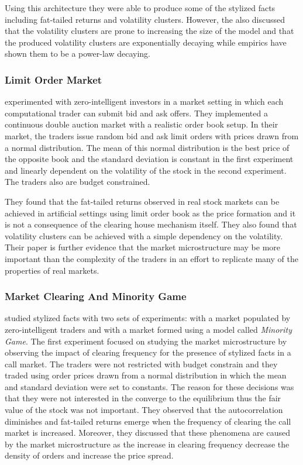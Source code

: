 Using this architecture they were able to produce some of the stylized facts
including fat-tailed returns and volatility clusters. However, the also discussed
that the volatility clusters are prone to increasing the size of the model and
that the produced volatility clusters are exponentially decaying while empirics have
shown them to be a power-law decaying.

\subsubsection{Limit Order Market}
\citet{Raberto05} experimented with zero-intelligent investors in a market setting
in which each computational trader can submit bid and ask offers. They
implemented a continuous double auction market with a realistic order
book setup. In their market, the traders issue random bid and ask limit
orders with prices drawn from a normal distribution. The mean of this 
normal distribution is the best price of the opposite book and the 
standard deviation is constant in the first experiment and linearly 
dependent on the volatility of the stock in the second experiment. The
traders also are budget constrained. 

They found that the fat-tailed returns observed in
real stock markets can be achieved in artificial settings using limit 
order book as the price formation and it is not a consequence of the clearing 
house mechanism itself. They also found that volatility clusters can
be achieved with a simple dependency on the volatility. Their paper
is further evidence that the market microstructure may be more
important than the complexity of the traders in an effort to replicate
many of the properties of real markets.

\subsubsection{Market Clearing And Minority Game}

\citet{LIU20082535} studied stylized facts with two sets of experiments: with
a market populated by zero-intelligent traders and with a market formed using 
a model called \textit{Minority Game}. The first experiment focused on studying
the market microstructure by observing the impact of clearing frequency for the 
presence of stylized facts in a call market. The traders were not restricted with budget 
constrain and they traded using order prices drawn from a normal distribution 
in which the mean and standard deviation were set to constants. The reason 
for these decisions was that they were not interested in the converge to 
the equilibrium thus the fair value of the stock was not important. They 
observed that the autocorrelation diminishes and fat-tailed returns emerge 
when the frequency of clearing the call market is increased. Moreover,
they discussed that these phenomena are caused by the market microstructure
as the increase in clearing frequency decrease the density of orders and 
increase the price spread.

